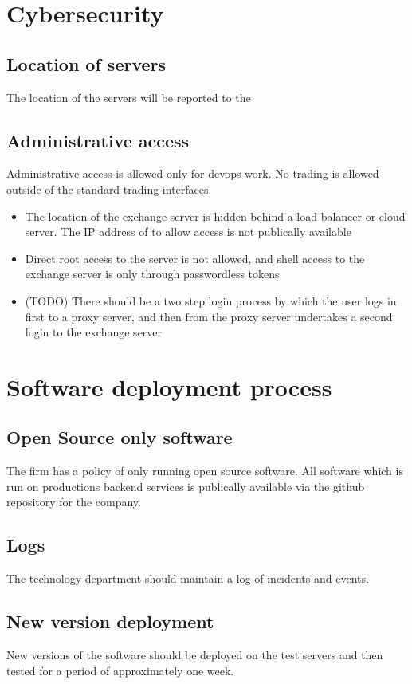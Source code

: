 \section{Cybersecurity}

\subsection{Location of servers}
The location of the servers will be reported to the 

\subsection{Administrative access}
Administrative access is allowed only for devops work.  No trading is
allowed outside of the standard trading interfaces.

\begin{itemize}
\item The location of the exchange server is hidden behind a load
  balancer or cloud server.  The IP address of to allow access is not
  publically available
\item Direct root access to the server is not allowed, and shell access to
  the exchange server is only through passwordless tokens
\item (TODO) There should be a two step login process by which the
  user logs in first to a proxy server, and then from the proxy server
  undertakes a second login to the exchange server
\end{itemize}

\section{Software deployment process}
\subsection{Open Source only software}

The firm has a policy of only running open source software.  All
software which is run on productions backend services is publically
available via the github repository for the company.

\subsection{Logs}
The technology department should maintain a log of incidents and
events.  

\subsection{New version deployment}
New versions of the software should be deployed on the test servers
and then tested for a period of approximately one week.

